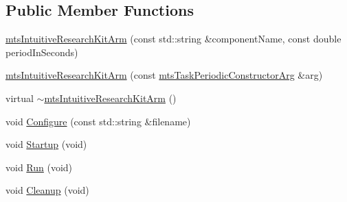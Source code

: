 \subsection*{Public Member Functions}
\begin{DoxyCompactItemize}
\item 
\hyperlink{classmts_intuitive_research_kit_arm_a8decc3089690262d5f765448174befdb}{mts\+Intuitive\+Research\+Kit\+Arm} (const std\+::string \&component\+Name, const double period\+In\+Seconds)
\item 
\hyperlink{classmts_intuitive_research_kit_arm_a1a1612a7a6dc75e002b598731741b590}{mts\+Intuitive\+Research\+Kit\+Arm} (const \hyperlink{classmts_task_periodic_constructor_arg}{mts\+Task\+Periodic\+Constructor\+Arg} \&arg)
\item 
virtual \hyperlink{classmts_intuitive_research_kit_arm_a1f3ac4f67e8a147dedff9509fb197d60}{$\sim$mts\+Intuitive\+Research\+Kit\+Arm} ()
\item 
void \hyperlink{classmts_intuitive_research_kit_arm_a0f878813b53d9bd84a00c856d929c4a2}{Configure} (const std\+::string \&filename)
\item 
void \hyperlink{classmts_intuitive_research_kit_arm_aa3638a3cb658b82ccde00bd703e843c6}{Startup} (void)
\item 
void \hyperlink{classmts_intuitive_research_kit_arm_a1694cd44f39f14e0a9d8df7052aa60f1}{Run} (void)
\item 
void \hyperlink{classmts_intuitive_research_kit_arm_a5d63e8f8e3bade35d9aa5d11ccac5123}{Cleanup} (void)
\end{DoxyCompactItemize}
